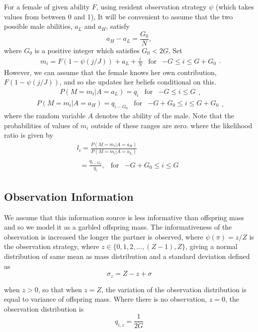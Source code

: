 \documentclass[10pt]{article}
\begin{document}
For a female of given ability $F$, using resident observation strategy
$\psi$ (which takes values from between 0 and 1), It will be convenient
to assume that the two possible male abilities, $a_{L}$ and $a_{H}$,
satisfy 
\[
a_{H}-a_{L}=\frac{G_{0}}{N},
\]
where $G_{0}$ is a positive integer which satisfies $G_{0}<2G$.
Set 
\begin{equation}
	\begin{array}{ccc}
		m_{i}=F(1-\psi(j/J))+a_{L}+\frac{i}{N} & \text{for} & -G\leq i\leq G+G_{0}\end{array}.\label{eq:-4}
\end{equation}
However, we can assume that the female knows her own contribution,
$F(1-\psi(j/J))$, and so she updates her beliefs conditional on this.
\[
\begin{array}{ccc}
	P(M=m_{i}|A=a_{L})=q_{i} & \text{for} & -G\leq i\leq G\end{array},
\]
\[
\begin{array}{ccc}
	P(M=m_{i}|A=a_{H})=q_{i-G_{0}} & \text{for} & -G+G_{0}\leq i\leq G+G_{0}\end{array},
\]
where the random variable $A$ denotes the ability of the male. Note
that the probabilities of values of $m_{i}$ outside of these ranges
are zero. where the likelihood ratio is given by 
\begin{multline*}
	l_{i}=\frac{P(M=m_{i}|A=a_{H})}{P(M=m_{i}|A=a_{L})}\\
	\begin{array}{ccc}
		=\frac{q_{i-G_{0}}}{q_{i}}, & \text{for} & -G+G_{0}\leq i\leq G\end{array}
\end{multline*}


\subsection{Observation Information }

We assume that this information source is less informative than offspring
mass and so we model it as a garbled offspring mass. The informativeness
of the observation is increased the longer the partner is observed,
where $\psi(\pi)=z/Z$ is the observation strategy, where $z\in\{0,1,2,...,(Z-1),Z\}$,
giving a normal distribution of same mean as mass distribution and
a standard deviation defined as
\begin{equation}
	\sigma_{z}=Z-z+\sigma\label{eq:-9}
\end{equation}

when $z>0$, so that when $z=Z$, the variation of the observation
distribution is equal to variance of offspring mass. Where there is
no observation, $z=0$, the observation distribution is
\begin{equation}
	q_{i,z}=\frac{1}{2G}\label{eq:-10}
\end{equation}
\end{document}
